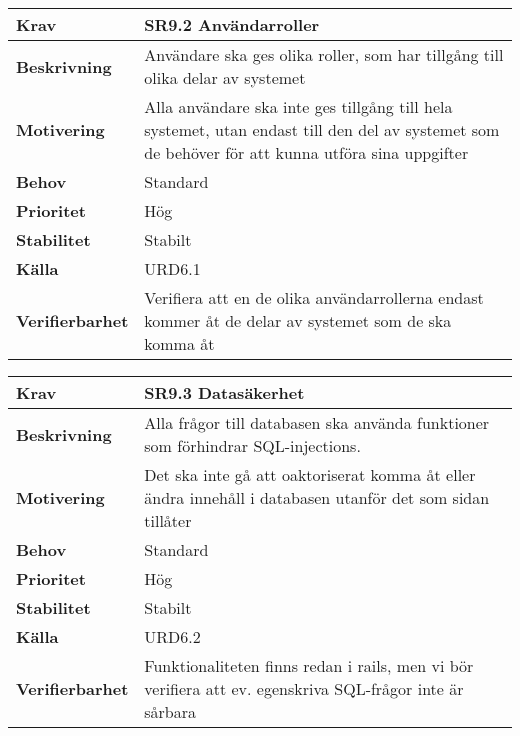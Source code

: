 \documentclass[a4paper, twoside, 11pt, titlepage]{article}
\begin{document}
\begin{tabular} { p{2.6cm} p{12.5cm} }
	\hline
	\sffamily\textbf{Krav} & SR9.2 Användarroller  \\
	\hline
	\sffamily\textbf{Beskrivning} & Användare ska ges olika roller, som har tillgång till olika delar av systemet  \\
	\hline
	\sffamily\textbf{Motivering} & Alla användare ska inte ges tillgång till hela systemet, utan endast till den del av systemet som de behöver för att kunna utföra sina uppgifter  \\
	\hline
	\sffamily\textbf{Behov} & Standard  \\
	\hline
	\sffamily\textbf{Prioritet} & Hög  \\
	\hline
	\sffamily\textbf{Stabilitet} & Stabilt  \\
	\hline
	\sffamily\textbf{Källa} & URD6.1  \\
	\hline
	\sffamily\textbf{Verifierbarhet} & Verifiera att en de olika användarrollerna endast kommer åt de delar av systemet som de ska komma åt  \\
	\hline
\end{tabular}
\vspace{6mm}

\begin{tabular} { p{2.6cm} p{12.5cm} }
	\hline
	\sffamily\textbf{Krav} & SR9.3 Datasäkerhet  \\
	\hline
	\sffamily\textbf{Beskrivning} & Alla frågor till databasen ska använda funktioner som förhindrar SQL-injections.  \\
	\hline
	\sffamily\textbf{Motivering} & Det ska inte gå att oaktoriserat komma åt eller ändra innehåll i databasen utanför det som sidan tillåter  \\
	\hline
	\sffamily\textbf{Behov} & Standard  \\
	\hline
	\sffamily\textbf{Prioritet} & Hög  \\
	\hline
	\sffamily\textbf{Stabilitet} & Stabilt  \\
	\hline
	\sffamily\textbf{Källa} & URD6.2  \\
	\hline
	\sffamily\textbf{Verifierbarhet} & Funktionaliteten finns redan i rails, men vi bör verifiera att ev. egenskriva SQL-frågor inte är sårbara  \\
	\hline
\end{tabular}
\vspace{6mm}
\end{document}

